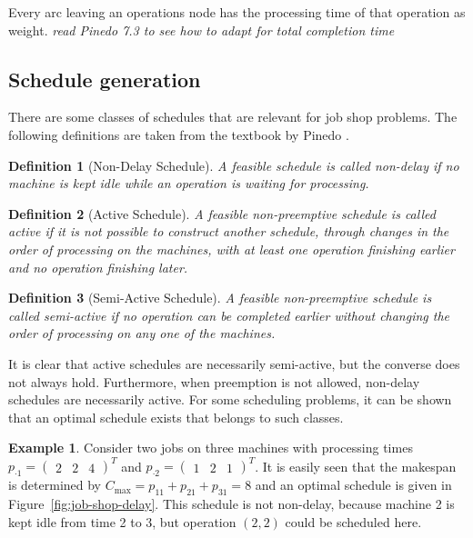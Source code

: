 \documentclass{article}
\theoremstyle{definition}
\newtheorem{eg}{Example}[section]
\theoremstyle{plain}
\newtheorem{define}{Definition}[section]
\begin{document}
Every arc leaving an operations node has the processing time of that operation
as weight.
\textit{\color{blue}read Pinedo 7.3 to see how to adapt for total completion time}

\subsection{Schedule generation}
There are some classes of schedules that are relevant for job shop problems. The
following definitions are taken from the textbook by Pinedo
\cite{pinedoSchedulingTheoryAlgorithms2016}.

\begin{define}[Non-Delay Schedule]
A feasible schedule is called non-delay if no
machine is kept idle while an operation is waiting for processing.
\end{define}

\begin{define}[Active Schedule]
A feasible non-preemptive schedule is called active if
it is not possible to construct another schedule, through changes in the order
of processing on the machines, with at least one operation finishing earlier and
no operation finishing later.
\end{define}

\begin{define}[Semi-Active Schedule]
A feasible non-preemptive schedule is called
semi-active if no operation can be completed earlier without changing the order
of processing on any one of the machines.
\end{define}

It is clear that active schedules are necessarily semi-active, but the converse
does not always hold. Furthermore, when preemption is not allowed, non-delay
schedules are necessarily active. For some scheduling problems, it can be shown
that an optimal schedule exists that belongs to such classes.

\begin{eg}
  \label{eg:job-shop-non-delay}
  Consider two jobs on three machines with processing times
  $p_{\cdot 1} = \begin{pmatrix} 2 & 2 & 4 \end{pmatrix}^T$ and
  $p_{\cdot 2} = \begin{pmatrix} 1 & 2 & 1 \end{pmatrix}^T$. It is easily seen
  that the makespan is determined by
  $C_\text{max} = p_{11} + p_{21} + p_{31} = 8$ and an optimal schedule is given
  in Figure~\ref{fig:job-shop-delay}. This schedule is not non-delay, because
  machine 2 is kept idle from time 2 to 3, but operation $(2,2)$ could be
  scheduled here.
\end{eg}
\end{document}
